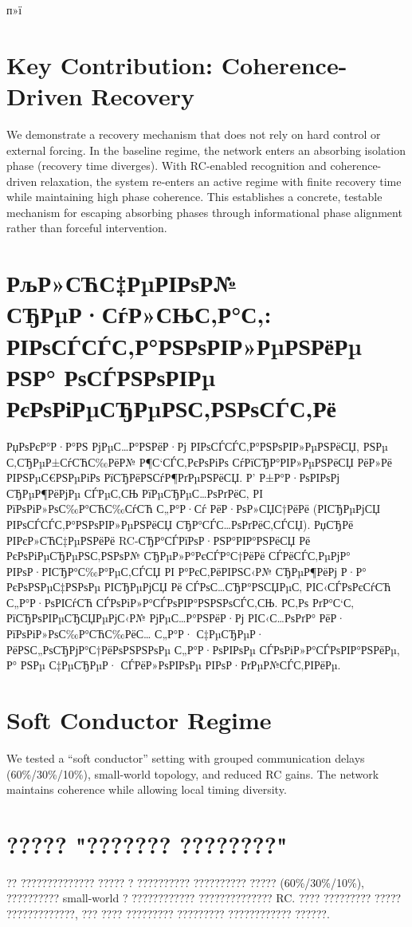 ﻿п»ї\documentclass[12pt,a4paper]{article}
\begin{document}
\section{Key Contribution: Coherence-Driven Recovery}
We demonstrate a recovery mechanism that does not rely on hard control or external forcing. In the baseline regime, the network enters an absorbing isolation phase (recovery time diverges). With RC-enabled recognition and coherence-driven relaxation, the system re-enters an active regime with finite recovery time while maintaining high phase coherence. This establishes a concrete, testable mechanism for escaping absorbing phases through informational phase alignment rather than forceful intervention.

\section{РљР»СЋС‡РµРІРѕР№ СЂРµР·СѓР»СЊС‚Р°С‚: РІРѕСЃСЃС‚Р°РЅРѕРІР»РµРЅРёРµ РЅР° РѕСЃРЅРѕРІРµ РєРѕРіРµСЂРµРЅС‚РЅРѕСЃС‚Рё}
РџРѕРєР°Р·Р°РЅ РјРµС…Р°РЅРёР·Рј РІРѕСЃСЃС‚Р°РЅРѕРІР»РµРЅРёСЏ, РЅРµ С‚СЂРµР±СѓСЋС‰РёР№ Р¶С‘СЃС‚РєРѕРіРѕ СѓРїСЂР°РІР»РµРЅРёСЏ РёР»Рё РІРЅРµС€РЅРµРіРѕ РїСЂРёРЅСѓР¶РґРµРЅРёСЏ. Р’ Р±Р°Р·РѕРІРѕРј СЂРµР¶РёРјРµ СЃРµС‚СЊ РїРµСЂРµС…РѕРґРёС‚ РІ РїРѕРіР»РѕС‰Р°СЋС‰СѓСЋ С„Р°Р·Сѓ РёР·РѕР»СЏС†РёРё (РІСЂРµРјСЏ РІРѕСЃСЃС‚Р°РЅРѕРІР»РµРЅРёСЏ СЂР°СЃС…РѕРґРёС‚СЃСЏ). РџСЂРё РІРєР»СЋС‡РµРЅРёРё RC-СЂР°СЃРїРѕР·РЅР°РІР°РЅРёСЏ Рё РєРѕРіРµСЂРµРЅС‚РЅРѕР№ СЂРµР»Р°РєСЃР°С†РёРё СЃРёСЃС‚РµРјР° РІРѕР·РІСЂР°С‰Р°РµС‚СЃСЏ РІ Р°РєС‚РёРІРЅС‹Р№ СЂРµР¶РёРј Р·Р° РєРѕРЅРµС‡РЅРѕРµ РІСЂРµРјСЏ Рё СЃРѕС…СЂР°РЅСЏРµС‚ РІС‹СЃРѕРєСѓСЋ С„Р°Р·РѕРІСѓСЋ СЃРѕРіР»Р°СЃРѕРІР°РЅРЅРѕСЃС‚СЊ. Р­С‚Рѕ РґР°С‘С‚ РїСЂРѕРІРµСЂСЏРµРјС‹Р№ РјРµС…Р°РЅРёР·Рј РІС‹С…РѕРґР° РёР· РїРѕРіР»РѕС‰Р°СЋС‰РёС… С„Р°Р· С‡РµСЂРµР· РёРЅС„РѕСЂРјР°С†РёРѕРЅРЅРѕРµ С„Р°Р·РѕРІРѕРµ СЃРѕРіР»Р°СЃРѕРІР°РЅРёРµ, Р° РЅРµ С‡РµСЂРµР· СЃРёР»РѕРІРѕРµ РІРѕР·РґРµР№СЃС‚РІРёРµ.


\section{Soft Conductor Regime}
We tested a ``soft conductor'' setting with grouped communication delays (60\%/30\%/10\%), small-world topology, and reduced RC gains. The network maintains coherence while allowing local timing diversity.

\section{????? "??????? ????????"}
?? ?????????????? ????? ? ?????????? ?????????? ????? (60\%/30\%/10\%), ?????????? small-world ? ???????????? ?????????????? RC. ???? ????????? ????? ?????????????, ??? ???? ????????? ????????? ???????????? ??????.
\end{document}

